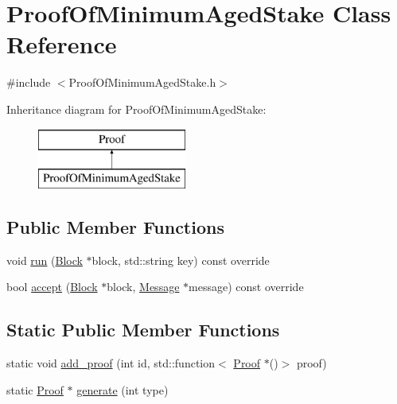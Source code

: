 \hypertarget{classProofOfMinimumAgedStake}{}\section{Proof\+Of\+Minimum\+Aged\+Stake Class Reference}
\label{classProofOfMinimumAgedStake}


{\ttfamily \#include $<$Proof\+Of\+Minimum\+Aged\+Stake.\+h$>$}

Inheritance diagram for Proof\+Of\+Minimum\+Aged\+Stake\+:\begin{figure}[H]
\begin{center}
\leavevmode
\includegraphics[height=2.000000cm]{classProofOfMinimumAgedStake}
\end{center}
\end{figure}
\subsection*{Public Member Functions}
\begin{DoxyCompactItemize}
\item 
void \mbox{\hyperlink{classProofOfMinimumAgedStake_aab3c754b7bc7c1c1e2ccebdaa764249b}{run}} (\mbox{\hyperlink{classBlock}{Block}} $\ast$block, std\+::string key) const override
\item 
bool \mbox{\hyperlink{classProofOfMinimumAgedStake_aa42f7b715bb986143b5dda841782745b}{accept}} (\mbox{\hyperlink{classBlock}{Block}} $\ast$block, \mbox{\hyperlink{classMessage}{Message}} $\ast$message) const override
\end{DoxyCompactItemize}
\subsection*{Static Public Member Functions}
\begin{DoxyCompactItemize}
\item 
static void \mbox{\hyperlink{classProof_a71874539fdbcc93c15594b889c95225b}{add\+\_\+proof}} (int id, std\+::function$<$ \mbox{\hyperlink{classProof}{Proof}} $\ast$()$>$ proof)
\item 
static \mbox{\hyperlink{classProof}{Proof}} $\ast$ \mbox{\hyperlink{classProof_a267f0f4587babb59884b5f280e2d54c8}{generate}} (int type)
\end{DoxyCompactItemize}
